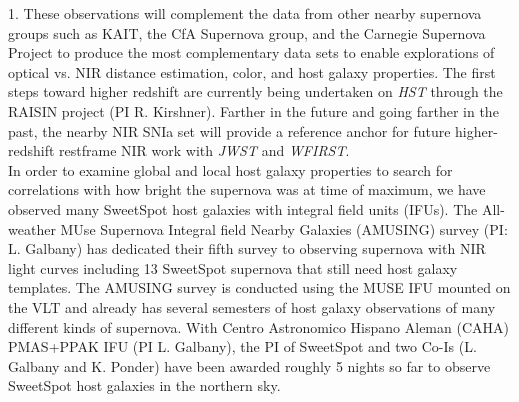 \documentclass[11pt]{article}
\begin{document}


% 
% 
%

\otherfacilities

1. These observations will complement the data from other nearby supernova groups such as KAIT, the CfA Supernova group, and the Carnegie Supernova Project to produce the most complementary data sets to enable explorations of optical vs. NIR distance estimation, color, and host galaxy properties.
The first steps toward higher redshift are currently being undertaken on {\it HST} through the RAISIN project (PI R. Kirshner).
Farther in the future and going farther in the past, the nearby NIR SNIa set will provide a reference anchor for future higher-redshift restframe NIR work with {\it JWST} and {\it WFIRST}. \\
In order to examine global and local host galaxy properties to search for correlations with how bright the supernova was at time of maximum, we have observed many SweetSpot host galaxies with integral field units (IFUs).
The All-weather MUse Supernova Integral field Nearby Galaxies (AMUSING) survey (PI: L. Galbany) has dedicated their fifth survey to observing supernova with NIR light curves including 13 SweetSpot supernova that still need host galaxy templates. 
The AMUSING survey is conducted using the MUSE IFU mounted on the VLT and already has several semesters of host galaxy observations of many different kinds of supernova. 
With Centro Astronomico Hispano Aleman (CAHA) PMAS+PPAK IFU (PI L. Galbany), the PI of SweetSpot and two Co-Is (L. Galbany and K. Ponder) have been awarded roughly 5 nights so far to observe SweetSpot host galaxies in the northern sky. \\
\end{document}
